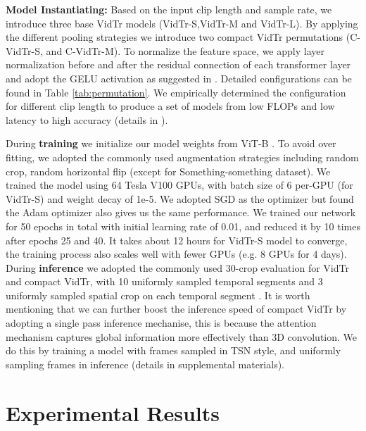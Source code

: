 \documentclass[10pt,twocolumn,letterpaper]{article}
\begin{document}
\textbf{Model Instantiating:} Based on the input clip length and sample rate, we introduce three base VidTr models (VidTr-S,VidTr-M and VidTr-L). By applying the different pooling strategies we introduce two compact VidTr permutations (C-VidTr-S, and C-VidTr-M). 
To normalize the feature space, we apply layer normalization before and after the residual connection of each transformer layer and adopt the GELU activation as suggested in \cite{dosovitskiy2020image}. Detailed configurations can be found in Table \ref{tab:permutation}. We empirically determined the configuration for different clip length to produce a set of models from low FLOPs and low latency to high 
accuracy (details in ). 

During \textbf{training} we initialize our model weights from ViT-B \cite{dosovitskiy2020image}. To avoid over fitting, we adopted the commonly used augmentation strategies including random crop, random horizontal flip (except for Something-something dataset). We trained the model using 64 Tesla V100 GPUs, with batch size of 6 per-GPU (for VidTr-S) and weight decay of 1e-5.
We adopted SGD as the optimizer but found the Adam optimizer also gives us the same performance. We trained our network for 50 epochs in total with initial learning rate of 0.01, and reduced it by 10 times after epochs 25 and 40. It takes about 12 hours for VidTr-S model to converge, the training process also scales well with fewer GPUs (e.g. 8 GPUs for 4 days).
During \textbf{inference} we adopted the commonly used 30-crop evaluation for VidTr and compact VidTr, with 10 uniformly sampled temporal segments and 3 uniformly sampled spatial crop on each temporal segment \cite{wang2018non}. It is worth mentioning that we can further boost the inference speed of compact VidTr by adopting a single pass inference mechanise, this is because the attention mechanism captures global information more effectively than 3D convolution. We do this by training a model with frames sampled in TSN \cite{wang_ECCV2016_TSN} style, and uniformly sampling  frames in inference (details in supplemental materials). 

 
\section{Experimental Results}
\end{document}
